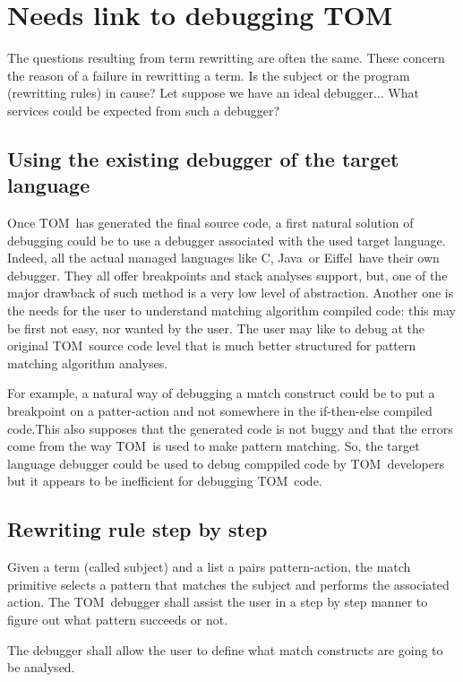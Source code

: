 \documentclass[a4paper]{article}
\newcommand{\TOM}{\textsf{TOM}}
\newcommand{\C}{\textsf{C}}
\newcommand{\Java}{\textsf{Java}}
\newcommand{\Eiffel}{\textsf{Eiffel}}
\begin{document}
\newpage

\section{Needs link to debugging \TOM}
The questions resulting from term rewritting are often the same. These
concern the reason of a failure in rewritting a term. Is the subject
or the program (rewritting rules) in cause? Let suppose we have an
ideal debugger... What services could be expected from such a debugger?

\subsection{Using the existing debugger of the target language}
Once \TOM\ has generated the final source code, a first natural
solution of debugging could be to use a debugger associated with the
used target language. Indeed, all the actual managed languages like
\C, \Java\ or \Eiffel\ have their own debugger. They all
offer breakpoints and stack analyses support, but, one of the major drawback of such
method is a very low level of abstraction. Another one is the needs
for the user to understand matching algorithm compiled code:
this may be first not easy, nor wanted by the user. The user may like
to debug at the original \TOM\ source code level that is much better structured for pattern
matching algorithm analyses.

For example, a natural way of debugging a match construct could be to
put a breakpoint on a patter-action and not somewhere in the if-then-else
compiled code.This also supposes that the generated code is not buggy
and that the errors come from the way \TOM\ is used to make pattern matching.
So, the target language debugger could be used to debug comppiled code
by \TOM\ developers but it appears to be inefficient for debugging
\TOM\ code.

\subsection{Rewriting rule step by step}
Given a term (called subject) and a list a pairs pattern-action, the
match primitive selects a pattern that matches the subject and
performs the associated action.
The \TOM\ debugger shall assist the user in a step by step manner to
figure out what pattern succeeds or not.

The debugger shall allow the user to define what match constructs are
going to be analysed.
\end{document}
